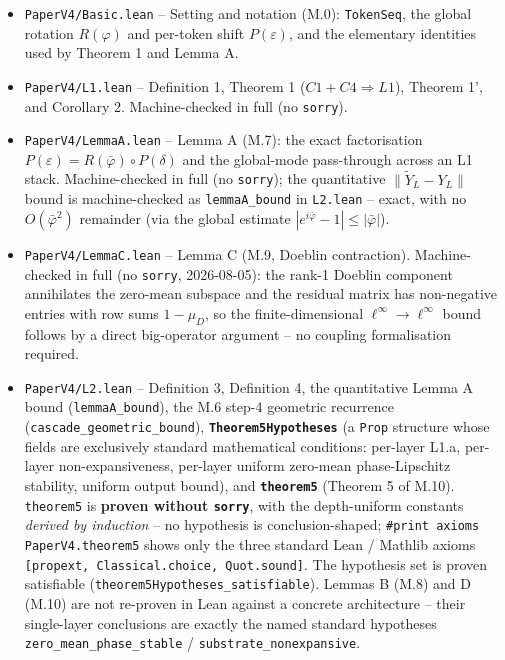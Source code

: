 \documentclass[11pt,a4paper]{article}
\theoremstyle{plain}
\theoremstyle{definition}
\begin{document}
\begin{itemize}
  \item \texttt{PaperV4/Basic.lean} -- Setting and notation (M.0): \texttt{TokenSeq}, the global rotation $R(\varphi )$ and per-token shift $P(\varepsilon )$, and the elementary identities used by Theorem 1 and Lemma A.
  \item \texttt{PaperV4/L1.lean} -- Definition 1, Theorem 1 ($C1 + C4 \Rightarrow  L1$), Theorem 1', and Corollary 2. Machine-checked in full (no \texttt{sorry}).
  \item \texttt{PaperV4/LemmaA.lean} -- Lemma A (M.7): the exact factorisation $P(\varepsilon ) = R(\bar \varphi ) \circ  P(\delta )$ and the global-mode pass-through across an L1 stack. Machine-checked in full (no \texttt{sorry}); the quantitative $\|\tilde Y_L - Y_L\|$ bound is machine-checked as \texttt{lemmaA\_bound} in \texttt{L2.lean} -- exact, with no $O(\bar\varphi^2)$ remainder (via the global estimate $|e^{i\bar\varphi} - 1| \le |\bar\varphi|$).
  \item \texttt{PaperV4/LemmaC.lean} -- Lemma C (M.9, Doeblin contraction). Machine-checked in full (no \texttt{sorry}, 2026-08-05): the rank-1 Doeblin component annihilates the zero-mean subspace and the residual matrix has non-negative entries with row sums $1 - \mu_D$, so the finite-dimensional $\ell^\infty \to \ell^\infty$ bound follows by a direct big-operator argument -- no coupling formalisation required.
  \item \texttt{PaperV4/L2.lean} -- Definition 3, Definition 4, the quantitative Lemma A bound (\texttt{lemmaA\_bound}), the M.6 step-4 geometric recurrence (\texttt{cascade\_geometric\_bound}), \textbf{\texttt{Theorem5Hypotheses}} (a \texttt{Prop} structure whose fields are exclusively standard mathematical conditions: per-layer L1.a, per-layer non-expansiveness, per-layer uniform zero-mean phase-Lipschitz stability, uniform output bound), and \textbf{\texttt{theorem5}} (Theorem 5 of M.10). \texttt{theorem5} is \textbf{proven without \texttt{sorry}}, with the depth-uniform constants \emph{derived by induction} -- no hypothesis is conclusion-shaped; \texttt{\#print axioms PaperV4.theorem5} shows only the three standard Lean / Mathlib axioms \texttt{[propext, Classical.choice, Quot.sound]}. The hypothesis set is proven satisfiable (\texttt{theorem5Hypotheses\_satisfiable}). Lemmas B (M.8) and D (M.10) are not re-proven in Lean against a concrete architecture -- their single-layer conclusions are exactly the named standard hypotheses \texttt{zero\_mean\_phase\_stable} / \texttt{substrate\_nonexpansive}.
\end{itemize}
\end{document}
